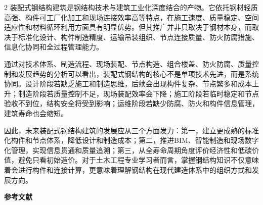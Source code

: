 \documentclass[UTF8,a4paper,10.5pt]{ctexart}
\newenvironment{bodytext}{\fontsize{10.5pt}{16pt}\selectfont\songti}{}
\begin{document}
\begin{bodytext}
\begin{multicols}{2}
装配式钢结构建筑是钢结构技术与建筑工业化深度结合的产物。它依托钢材轻质高强、构件可工厂化加工和现场连接效率高等特点，在施工速度、质量稳定、空间适应性和材料循环利用方面具有明显优势。但其推广并非只取决于钢材本身，而取决于标准化设计、构件制造精度、运输吊装组织、节点连接质量、防火防腐措施、信息化协同和全过程管理能力。

通过对技术体系、制造流程、现场装配、节点构造、组合楼盖、防火防腐、质量控制和发展趋势的分析可以看出，装配式钢结构的核心不是单项技术先进，而是系统协同。设计阶段若缺乏施工和制造思维，后续会出现构件复杂、节点繁多和成本上升；制造阶段若质量控制不足，现场装配效率会下降；施工阶段若临时稳定和节点验收不到位，结构安全将受到影响；运维阶段若缺少防腐、防火和构件信息管理，建筑寿命也会缩短。

因此，未来装配式钢结构建筑的发展应从三个方面发力：第一，建立更成熟的标准化构件和节点体系，降低设计和制造成本；第二，推进BIM、智能制造和现场数字化管理，实现信息贯通和质量追溯；第三，从全寿命周期角度评价经济性和低碳价值，避免只看初始造价。对于土木工程专业学习者而言，掌握钢结构知识不仅意味着会进行构件和连接计算，更意味着理解钢结构在现代建造体系中的组织方式和发展方向。

\end{multicols}
\end{bodytext}

\vspace{0.5\baselineskip}
\begin{center}
{\songti\bfseries 参\quad 考\quad 文\quad 献}
\end{center}
\vspace{0.5\baselineskip}
\end{document}
